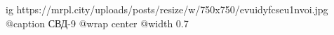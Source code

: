  
 
 
 
 

\ifcmt
  ig https://mrpl.city/uploads/posts/resize/w/750x750/evuidyfcseu1nvoi.jpg
  @caption СВД-9
  @wrap center
  @width 0.7
\fi
